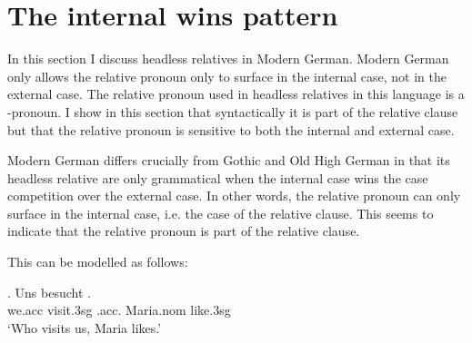 



\section{The internal wins pattern}


In this section I discuss headless relatives in Modern German. Modern German only allows the relative pronoun only to surface in the internal case, not in the external case. The relative pronoun used in headless relatives in this language is a -pronoun. I show in this section that syntactically it is part of the relative clause but that the relative pronoun is sensitive to both the internal and external case.

Modern German differs crucially from Gothic and Old High German in that its headless relative are only grammatical when the internal case wins the case competition over the external case. In other words, the relative pronoun can only surface in the internal case, i.e. the case of the relative clause. This seems to indicate that the relative pronoun is part of the relative clause.

This can be modelled as follows:

\exg. Uns besucht   .\\
 we.\ac{acc} visit.3\ac{sg}\scsub{[nom]} .\ac{acc}. Maria.\ac{nom} like.3\ac{sg}\scsub{[acc]}\\
 `Who visits us, Maria likes.' \label{ex:mg-nom-acc-wen}

